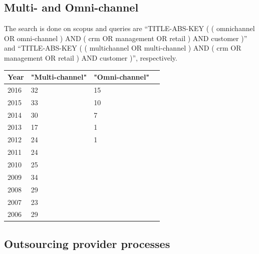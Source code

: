 \subsection{Multi- and Omni-channel}
\label{app:mcoc}
The search is done on scopus and queries are \enquote{TITLE-ABS-KEY ( ( omnichannel  OR  omni-channel )  AND  ( crm  OR  management  OR  retail )  AND  customer )} and \enquote{TITLE-ABS-KEY ( ( multichannel  OR  multi-channel )  AND  ( crm  OR  management  OR  retail )  AND  customer )}, respectively.

\begin{table}[caption={multi- and omni-channel publication comparison}, label=tab:crmnotioncomparison]
	\centering
	\begin{tabular}{p{1cm}| p{2cm} |p{4.3cm}|p{3cm}   } 
	\textbf{Year} & \textbf{"Multi-channel"} & \textbf{"Omni-channel"} \\ \hline 
	2016          & 32            & 15                                                                       \\
	2015          & 33            & 10                                                                   \\
	2014          & 30            & 7                                                                   \\
	2013          & 17            & 1                                                           \\
	2012          & 24            & 1                                                              \\
	2011          & 24            &                                                       \\
	2010          & 25            &                                                                \\
	2009          & 34            &                                                       \\
	2008          & 29             &                                             \\
	2007          & 23            &                                                       \\
	2006 & 29         &                           					 \\
\end{tabular}
\end{table}


\subsection{Outsourcing provider processes}
\label{app:provproc}

